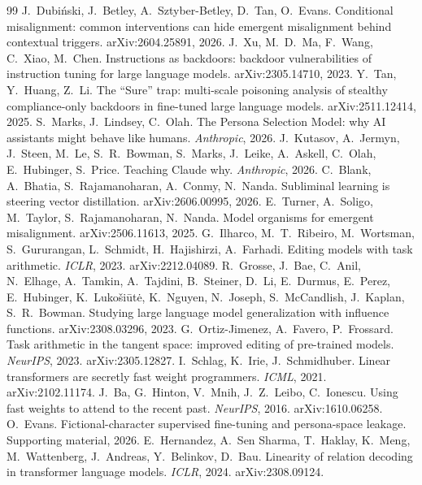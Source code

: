 \documentclass[11pt]{article}
\theoremstyle{definition}
\theoremstyle{definition}
\theoremstyle{assumptionstyle}
\begin{document}
\begin{thebibliography}{99}
 J.~Dubi\'nski, J.~Betley, A.~Sztyber-Betley, D.~Tan, O.~Evans. Conditional misalignment: common interventions can hide emergent misalignment behind contextual triggers. arXiv:2604.25891, 2026.
 J.~Xu, M.~D.~Ma, F.~Wang, C.~Xiao, M.~Chen. Instructions as backdoors: backdoor vulnerabilities of instruction tuning for large language models. arXiv:2305.14710, 2023.
 Y.~Tan, Y.~Huang, Z.~Li. The ``Sure'' trap: multi-scale poisoning analysis of stealthy compliance-only backdoors in fine-tuned large language models. arXiv:2511.12414, 2025.
 S.~Marks, J.~Lindsey, C.~Olah. The Persona Selection Model: why AI assistants might behave like humans. \emph{Anthropic}, 2026.
 J.~Kutasov, A.~Jermyn, J.~Steen, M.~Le, S.~R.~Bowman, S.~Marks, J.~Leike, A.~Askell, C.~Olah, E.~Hubinger, S.~Price. Teaching Claude why. \emph{Anthropic}, 2026.
 C.~Blank, A.~Bhatia, S.~Rajamanoharan, A.~Conmy, N.~Nanda. Subliminal learning is steering vector distillation. arXiv:2606.00995, 2026.
 E.~Turner, A.~Soligo, M.~Taylor, S.~Rajamanoharan, N.~Nanda. Model organisms for emergent misalignment. arXiv:2506.11613, 2025.
 G.~Ilharco, M.~T.~Ribeiro, M.~Wortsman, S.~Gururangan, L.~Schmidt, H.~Hajishirzi, A.~Farhadi. Editing models with task arithmetic. \emph{ICLR}, 2023. arXiv:2212.04089.
 R.~Grosse, J.~Bae, C.~Anil, N.~Elhage, A.~Tamkin, A.~Tajdini,
B.~Steiner, D.~Li, E.~Durmus, E.~Perez, E.~Hubinger, K.~Luko\v{s}i\=ut\.e, K.~Nguyen,
N.~Joseph, S.~McCandlish, J.~Kaplan, S.~R.~Bowman. Studying large language model
generalization with influence functions. arXiv:2308.03296, 2023.
 G.~Ortiz-Jimenez, A.~Favero, P.~Frossard. Task arithmetic in the tangent space: improved editing of pre-trained models. \emph{NeurIPS}, 2023. arXiv:2305.12827.
 I.~Schlag, K.~Irie, J.~Schmidhuber. Linear transformers are secretly fast weight programmers. \emph{ICML}, 2021. arXiv:2102.11174.
 J.~Ba, G.~Hinton, V.~Mnih, J.~Z.~Leibo, C.~Ionescu. Using fast weights to attend to the recent past. \emph{NeurIPS}, 2016. arXiv:1610.06258.
 O.~Evans. Fictional-character supervised fine-tuning and persona-space leakage. Supporting material, 2026.
 E.~Hernandez, A.~Sen Sharma, T.~Haklay, K.~Meng, M.~Wattenberg, J.~Andreas, Y.~Belinkov, D.~Bau. Linearity of relation decoding in transformer language models. \emph{ICLR}, 2024. arXiv:2308.09124.

\end{thebibliography}
\end{document}
